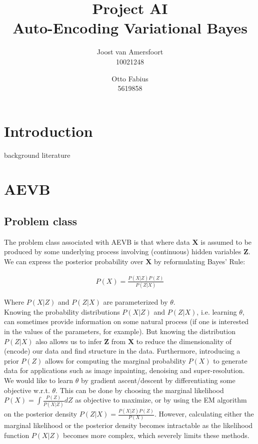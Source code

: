 \documentclass{article}
\begin{document}
\title{Project AI \\ Auto-Encoding Variational Bayes}
\author{	
	Joost van Amersfoort \\ 10021248  
	\and
	Otto Fabius \\ 5619858
	}
\maketitle

\section*{Introduction}
background literature \\ 


\section*{AEVB}

\subsection*{Problem class}

The problem class associated with AEVB is that where data $\mathbf{X}$ is assumed to be produced by some underlying process involving (continuous) hidden variables $\mathbf{Z}$. We can express the posterior probability over $\mathbf{X}$ by reformulating Bayes' Rule:

\begin{align*}
P(X) = \frac{P(X|Z)P(Z)}{P(Z|X)}
\end{align*}

Where $P(X|Z)$ and $P(Z|X)$ are parameterized by $\theta$.
\\

Knowing the probability distributions $P(X|Z)$ and $P(Z|X)$, i.e. learning $\theta$, can sometimes provide information on some natural process (if one is interested in the values of the parameters, for example). But knowing the distribution $P(Z|X)$ also allows us to infer $\mathbf{Z}$ from $\mathbf{X}$ to reduce the dimensionality of (encode) our data and find structure in the data. Furthermore, introducing a prior $P(Z)$ allows for computing the marginal probability $P(X)$ to generate data for applications such as image inpainting, denoising and super-resolution.
We would like to learn $\theta$ by gradient ascent/descent by differentiating some objective w.r.t. $\theta$. This can be done by choosing the marginal likelihood $P(X) = \int \frac{P(Z)}{P(X|Z)}dZ$ as objective to maximize, or by using the EM algorithm on the posterior density $ P(Z|X) = \frac{P(X|Z)P(Z)}{P(X)}$. However, calculating either  the marginal likelihood or the posterior density becomes intractable as the likelihood function $P(X|Z)$	 becomes more complex, which severely limits these methods.
\end{document}
